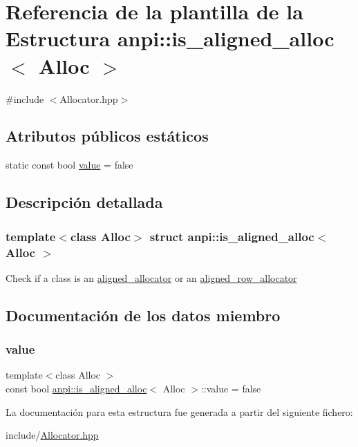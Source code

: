 \hypertarget{structanpi_1_1is__aligned__alloc}{}\section{Referencia de la plantilla de la Estructura anpi\+:\+:is\+\_\+aligned\+\_\+alloc$<$ Alloc $>$}
\label{structanpi_1_1is__aligned__alloc}


{\ttfamily \#include $<$Allocator.\+hpp$>$}

\subsection*{Atributos públicos estáticos}
\begin{DoxyCompactItemize}
\item 
static const bool \hyperlink{structanpi_1_1is__aligned__alloc_ab1697bd7d533767f1a2fd0f9831b3245}{value} = false
\end{DoxyCompactItemize}


\subsection{Descripción detallada}
\subsubsection*{template$<$class Alloc$>$\newline
struct anpi\+::is\+\_\+aligned\+\_\+alloc$<$ Alloc $>$}

Check if a class is an \hyperlink{classanpi_1_1aligned__allocator}{aligned\+\_\+allocator} or an \hyperlink{classanpi_1_1aligned__row__allocator}{aligned\+\_\+row\+\_\+allocator} 

\subsection{Documentación de los datos miembro}
\mbox{\label{structanpi_1_1is__aligned__alloc_ab1697bd7d533767f1a2fd0f9831b3245}} 
\subsubsection{\texorpdfstring{value}{value}}
{\footnotesize\ttfamily template$<$class Alloc $>$ \\
const bool \hyperlink{structanpi_1_1is__aligned__alloc}{anpi\+::is\+\_\+aligned\+\_\+alloc}$<$ Alloc $>$\+::value = false\hspace{0.3cm}{\ttfamily [static]}}



La documentación para esta estructura fue generada a partir del siguiente fichero\+:\begin{DoxyCompactItemize}
\item 
include/\hyperlink{Allocator_8hpp}{Allocator.\+hpp}\end{DoxyCompactItemize}
